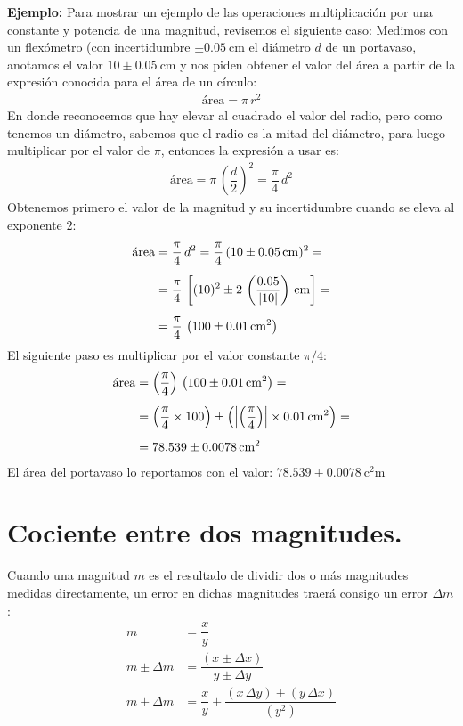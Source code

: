 \documentclass[14pt]{extarticle}
\begin{document}
\textbf{Ejemplo: } Para mostrar un ejemplo de las operaciones multiplicación por una constante y potencia de una magnitud, revisemos el siguiente caso: Medimos con un flexómetro (con incertidumbre $\pm \SI{0.05}{\centi\meter}$ el diámetro $d$ de un portavaso, anotamos el valor $\num{10} \pm \SI{0.05}{\centi\meter}$ y nos piden obtener el valor del área a partir de la expresión conocida para el área de un círculo:
\begin{align*}
\text{área} = \pi \, r^{2}
\end{align*}
En donde reconocemos que hay elevar al cuadrado el valor del radio, pero como tenemos un diámetro, sabemos que el radio es la mitad del diámetro, para luego multiplicar por el valor de $\pi$, entonces la expresión a usar es:
\begin{align*}
\text{área} = \pi \, \left( \dfrac{d}{2} \right)^{2} = \dfrac{\pi}{4} \, d^{2}
\end{align*}
Obtenemos primero el valor de la magnitud y su incertidumbre cuando se eleva al exponente $2$:
\begin{align*}
\text{área} &= \dfrac{\pi}{4} \, d^{2} = \dfrac{\pi}{4} \, (\num{10} \pm \SI{0.05}{\centi\meter})^2 = \\[0.5em]
&= \dfrac{\pi}{4} \, \left[ (\num{10})^2 \pm 2 \, \left( \dfrac{\num{0.05}}{\abs{10}} \right)  \, \unit{\centi\meter} \right] = \\[0.5em]
&= \dfrac{\pi}{4} \, \left( \num{100} \pm \SI{0.01}{\square\centi\meter} \right)
\end{align*}
El siguiente paso es multiplicar por el valor constante $\pi/4$:
\begin{align*}
\text{área} &= \left( \dfrac{\pi}{4} \right) \, \left( \num{100} \pm \SI{0.01}{\square\centi\meter} \right) = \\[0.5em]
&= \left( \dfrac{\pi}{4} \times \num{100} \right) \pm \left( \abs{\left( \dfrac{\pi}{4} \right)} \times \SI{0.01}{\square\centi\meter} \right) = \\[0.5em]
&= \num{78.539} \pm \SI{0.0078}{\square\centi\meter}
\end{align*}
El área del portavaso lo reportamos con el valor: $\num{78.539} \pm \SI{0.0078}{\square\centi\meter}$

\section{Cociente entre dos magnitudes.}

Cuando una magnitud $m$ es el resultado de dividir dos o más magnitudes medidas
directamente, un error en dichas magnitudes traerá consigo un error $\Delta m$:
\begin{align*}
m &= \dfrac{x}{y} \\[0.5em]
m \pm \Delta m &= \dfrac{(x \pm \Delta x)}{y \pm \Delta y} \\[0.5em]
m \pm \Delta m &= \dfrac{x}{y} \pm \dfrac{(x \, \Delta y) + (y \, \Delta x)}{(y^{2})}
\end{align*}
\end{document}
